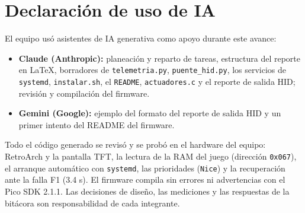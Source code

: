 \section{Declaración de uso de IA}
El equipo usó asistentes de IA generativa como apoyo durante este avance:
\begin{itemize}
	\item \textbf{Claude (Anthropic):} planeación y reparto de tareas, estructura del reporte en LaTeX,
	borradores de \texttt{telemetria.py}, \texttt{puente\_hid.py}, los servicios de \texttt{systemd},
	\texttt{instalar.sh}, el \texttt{README}, \texttt{actuadores.c} y el reporte de salida HID; revisión y
	compilación del firmware.
	\item \textbf{Gemini (Google):} ejemplo del formato del reporte de salida HID y un primer intento del README del firmware.
\end{itemize}
Todo el código generado se revisó y se probó en el hardware del equipo: RetroArch y la pantalla TFT,
la lectura de la RAM del juego (dirección \texttt{0x067}), el arranque automático con \texttt{systemd},
las prioridades (\texttt{Nice}) y la recuperación ante la falla F1 (3.4 s). El firmware compila sin
errores ni advertencias con el Pico SDK 2.1.1. Las decisiones de diseño, las mediciones y las respuestas
de la bitácora son responsabilidad de cada integrante.
